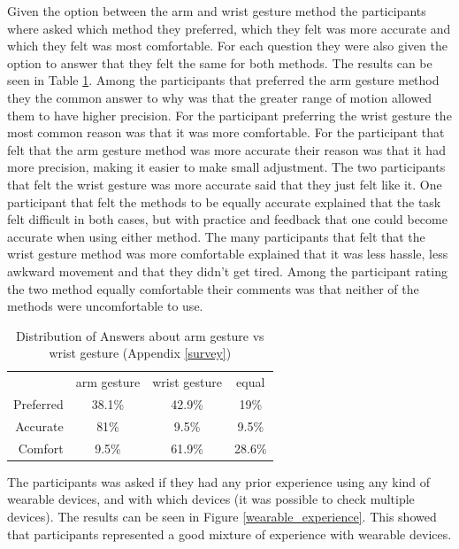 Given the option between the arm and wrist gesture method the participants where asked which method they preferred, which they felt was more accurate and which they felt was most comfortable. For each question they were also given the option to answer that they felt the same for both methods. The results can be seen in Table \ref{arm_vs_wrist}. Among the participants that preferred the arm gesture method they the common answer to why was that the greater range of motion allowed them to have higher precision. For the participant preferring the wrist gesture the most common reason was that it was more comfortable. For the participant that felt that the arm gesture method was more accurate their reason was that it had more precision, making it easier to make small adjustment. The two participants that felt the wrist gesture was more accurate said that they just felt like it. One participant that felt the methods to be equally accurate explained that the task felt difficult in both cases, but with practice and feedback that one could become accurate when using either method. The many participants that felt that the wrist gesture method was more comfortable explained that it was less hassle, less awkward movement and that they didn't get tired. Among the participant rating the two method equally comfortable their comments was that neither of the methods were uncomfortable to use. 


\begin{table}[h!]
\centering
\begin{tabular}{rccc}
\multicolumn{1}{c}{} & arm gesture & wrist gesture & equal \\ \cline{2-4} 
\multicolumn{1}{r|}{Preferred} & \multicolumn{1}{c|}{38.1\%} & \multicolumn{1}{c|}{42.9\%} & \multicolumn{1}{c|}{19\%} \\ \cline{2-4} 
\multicolumn{1}{r|}{Accurate} & \multicolumn{1}{c|}{81\%} & \multicolumn{1}{c|}{9.5\%} & \multicolumn{1}{c|}{9.5\%} \\ \cline{2-4} 
\multicolumn{1}{r|}{Comfort} & \multicolumn{1}{c|}{9.5\%} & \multicolumn{1}{c|}{61.9\%} & \multicolumn{1}{c|}{28.6\%} \\ \cline{2-4} 
\end{tabular}
\caption{Distribution of Answers about arm gesture vs wrist gesture (Appendix \ref{survey})}
\label{arm_vs_wrist}
\end{table}

The participants was asked if they had any prior experience using any kind of wearable devices, and with which devices (it was possible to check multiple devices). The results can be seen in Figure \ref{wearable_experience}. This showed that participants represented a good mixture of experience with wearable devices. 

